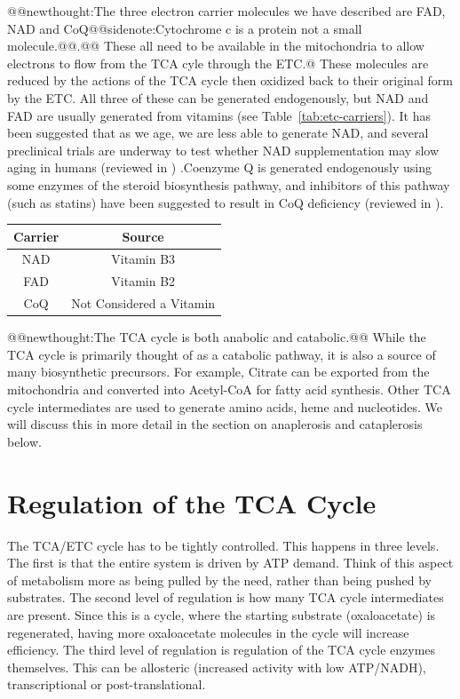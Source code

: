 \documentclass{tufte-handout}
\makeatletter
\def\newthought#1{@@newthought:#1@@}
\def\sidenote#1{@@sidenote:#1@@}
\makeatother
\begin{document}
\newthought{The three electron carrier molecules we have described are FAD, NAD and CoQ\nomenclature{CoQ}{Coenzyme Q (Ubiquinone)}\sidenote{Cytochrome c is a protein not a small molecule.}.} These all need to be available in the mitochondria to allow electrons to flow from the TCA cyle through the ETC.@  These molecules are reduced by the actions of the TCA cycle then oxidized back to their original form by the ETC.  All three of these can be generated endogenously, but NAD and FAD are usually generated from vitamins (see Table~\ref{tab:etc-carriers}).  It has been suggested that as we age, we are less able to generate NAD, and several preclinical trials are underway to test whether NAD supplementation may slow aging in humans (reviewed in \citet{Rajman2018})  .Coenzyme Q is generated endogenously using some enzymes of the steroid biosynthesis pathway, and inhibitors of this pathway (such as statins) have been suggested to result in CoQ deficiency (reviewed in \citet{Quinzii2007}).  

\begin{margintable}
\centering
\caption{Electron carrier molecules in the ETC}\label{tab:etc-carriers}
\begin{tabular}{cc}
\hline
\textbf {Carrier} & \textbf{Source}\\
\hline
NAD & Vitamin B3 \\
FAD & Vitamin B2  \\
CoQ & Not Considered a Vitamin \\
\hline
\end{tabular}
\end{margintable}

\newthought{The TCA cycle is both anabolic and catabolic.}  While the TCA cycle is primarily thought of as a catabolic pathway, it is also a source of many biosynthetic precursors.  For example, Citrate can be exported from the mitochondria and converted into Acetyl-CoA for fatty acid synthesis.  Other TCA cycle intermediates are used to generate amino acids, heme and nucleotides.  We will discuss this in more detail in the section on anaplerosis and cataplerosis below.

\section{Regulation of the TCA Cycle}

The TCA/ETC cycle has to be tightly controlled.  This happens in three levels.  The first is that the entire system is driven by ATP demand.  Think of this aspect of metabolism more as being pulled by the need, rather than being pushed by substrates.  The second level of regulation is how many TCA cycle intermediates are present.  Since this is a cycle, where the starting substrate (oxaloacetate) is regenerated, having more oxaloacetate molecules in the cycle will increase efficiency.  The third level of regulation is regulation of the TCA cycle enzymes themselves.  This can be allosteric (increased activity with low ATP/NADH), transcriptional or post-translational.
\end{document}
